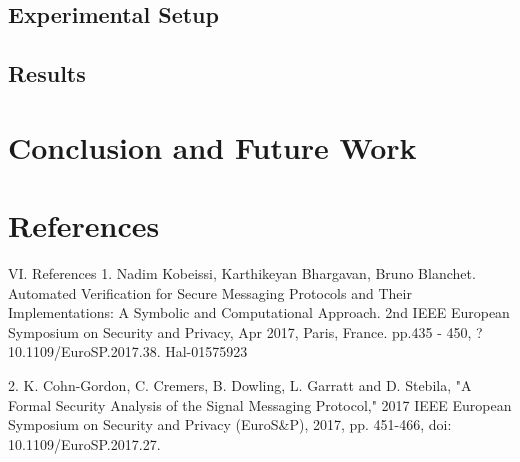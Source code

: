 \documentclass[12pt]{article}
\begin{document}
\subsection{Experimental Setup}
\par %

\subsection{Results}
\par %

\section{Conclusion and Future Work}
\par %





\newpage
\section{References}
VI. References
1. Nadim Kobeissi, Karthikeyan Bhargavan, Bruno Blanchet. Automated Verification for Secure Messaging Protocols and Their Implementations: A Symbolic and Computational Approach. 2nd IEEE European Symposium on Security and Privacy, Apr 2017, Paris, France. pp.435 - 450, ?10.1109/EuroSP.2017.38. Hal-01575923

2. K. Cohn-Gordon, C. Cremers, B. Dowling, L. Garratt and D. Stebila, "A Formal Security Analysis of the Signal Messaging Protocol," 2017 IEEE European Symposium on Security and Privacy (EuroS\&P), 2017, pp. 451-466, doi: 10.1109/EuroSP.2017.27.
\end{document}

